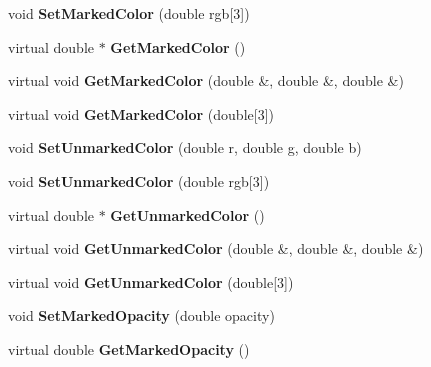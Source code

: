 \begin{DoxyCompactItemize}
\item 
\hypertarget{classvtkCellsFilter_aa0fb9773cebc32fa7ae86e997bed4966}{
void {\bfseries SetMarkedColor} (double rgb\mbox{[}3\mbox{]})}
\label{classvtkCellsFilter_aa0fb9773cebc32fa7ae86e997bed4966}

\item 
\hypertarget{classvtkCellsFilter_a5d39461ded33043d519c3ba355d7b16e}{
virtual double $\ast$ {\bfseries GetMarkedColor} ()}
\label{classvtkCellsFilter_a5d39461ded33043d519c3ba355d7b16e}

\item 
\hypertarget{classvtkCellsFilter_ac62c1d66aa484d2c990a48e43903ccf1}{
virtual void {\bfseries GetMarkedColor} (double \&, double \&, double \&)}
\label{classvtkCellsFilter_ac62c1d66aa484d2c990a48e43903ccf1}

\item 
\hypertarget{classvtkCellsFilter_a4c7806c7d22f7b19d91ce028bfd0f0ac}{
virtual void {\bfseries GetMarkedColor} (double\mbox{[}3\mbox{]})}
\label{classvtkCellsFilter_a4c7806c7d22f7b19d91ce028bfd0f0ac}

\item 
\hypertarget{classvtkCellsFilter_a86d9c6bff9700f59eb294c0ebd21695e}{
void {\bfseries SetUnmarkedColor} (double r, double g, double b)}
\label{classvtkCellsFilter_a86d9c6bff9700f59eb294c0ebd21695e}

\item 
\hypertarget{classvtkCellsFilter_a2690f015ae1ef26998849926b538acf0}{
void {\bfseries SetUnmarkedColor} (double rgb\mbox{[}3\mbox{]})}
\label{classvtkCellsFilter_a2690f015ae1ef26998849926b538acf0}

\item 
\hypertarget{classvtkCellsFilter_a3248dce3ceb5da63cc181a3a90a89dc7}{
virtual double $\ast$ {\bfseries GetUnmarkedColor} ()}
\label{classvtkCellsFilter_a3248dce3ceb5da63cc181a3a90a89dc7}

\item 
\hypertarget{classvtkCellsFilter_a6cb0615018390c9b479ac032c294f10d}{
virtual void {\bfseries GetUnmarkedColor} (double \&, double \&, double \&)}
\label{classvtkCellsFilter_a6cb0615018390c9b479ac032c294f10d}

\item 
\hypertarget{classvtkCellsFilter_afac17fc798859fbb800ce4a94291513e}{
virtual void {\bfseries GetUnmarkedColor} (double\mbox{[}3\mbox{]})}
\label{classvtkCellsFilter_afac17fc798859fbb800ce4a94291513e}

\item 
\hypertarget{classvtkCellsFilter_a1c16291e3ae310b8eae8d0a6b5194cf2}{
void {\bfseries SetMarkedOpacity} (double opacity)}
\label{classvtkCellsFilter_a1c16291e3ae310b8eae8d0a6b5194cf2}

\item 
\hypertarget{classvtkCellsFilter_acbcfbf1ef96ac0ec712e2d9e273c8186}{
virtual double {\bfseries GetMarkedOpacity} ()}
\label{classvtkCellsFilter_acbcfbf1ef96ac0ec712e2d9e273c8186}

\end{DoxyCompactItemize}
